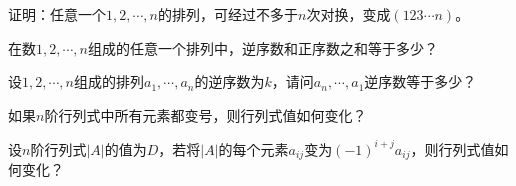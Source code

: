 
\begin{ex} \label{ex:2.2}
证明：任意一个$1,2,\cdots,n$的排列，可经过不多于$n$次对换，变成$(123\cdots n)$。
\end{ex}

\begin{ex} \label{ex:2.3}
在数$1,2,\cdots,n$组成的任意一个排列中，逆序数和正序数之和等于多少？
\end{ex}

\begin{ex} \label{ex:2.4}
设$1,2,\cdots,n$组成的排列$a_1,\cdots,a_n$的逆序数为$k$，请问$a_n,\cdots,a_1$逆序数等于多少？
\end{ex}

\begin{ex} \label{ex:2.5}
如果$n$阶行列式中所有元素都变号，则行列式值如何变化？
\end{ex}

\begin{ex} \label{ex:2.6}
设$n$阶行列式$|A|$的值为$D$，若将$|A|$的每个元素$a_{ij}$变为$(-1)^{i+j}a_{ij}$，则行列式值如何变化？
\end{ex}



